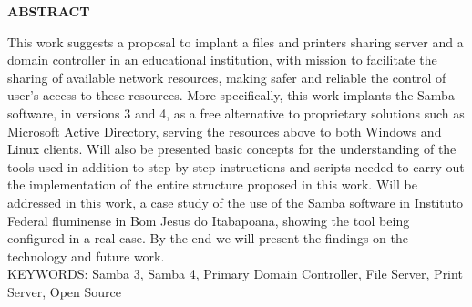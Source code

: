 \begin{center}
\textbf{ABSTRACT}
\end{center}

\singlespacing

\noindent This work suggests a proposal to implant a files and printers sharing server and a domain controller in an educational institution, with mission to facilitate the sharing of available network resources, making safer and reliable the control of user’s access to these resources. More specifically, this work implants the Samba software, in versions 3 and 4, as a free alternative to 
proprietary solutions such as Microsoft Active Directory, serving the resources above to both Windows and Linux clients. Will also be presented basic concepts for the understanding of the tools used in addition to step-by-step instructions and scripts needed to carry out the implementation of the entire structure proposed in this work. Will be addressed in this work, a case study of the use of the Samba software in Instituto Federal fluminense in Bom Jesus do Itabapoana, showing the tool being configured in a real case. By the end we will present the findings on the technology and future work.\\

\noindent KEYWORDS:  Samba 3, Samba 4, Primary Domain Controller, File Server, Print Server, Open Source